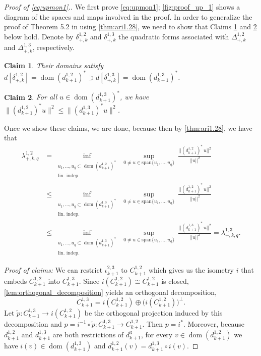 \documentclass[11pt]{article}
\newtheorem{claim}{Claim}[theorem]
\theoremstyle{definition}
\theoremstyle{remark}
\DeclareMathOperator\dom{dom}
\begin{document}
\begin{proof}[Proof of \eqref{eq:upmon1}.] We first prove \cref{eq:upmon1}; 
    \cref{fig:proof_up_1} shows a diagram of the spaces and maps involved in the proof.
    In order to generalize the proof of Theorem 5.2 in \citet{mww} using \cref{thm:ari1.28}, we need to show that Claims \ref{claim:doms} and \ref{claim:norms} below hold. Denote by $\delta_{+,k}^{1,2}$ and $\delta_{+,k}^{1,3}$ the quadratic forms associated with $\Delta_{+,k}^{1,2}$ and $\Delta_{+,k}^{1,3}$, respectively.
    \begin{claim}
        Their domains satisfy $d[\delta^{1,2}_{+,k}]=\dom (d^{1,2}_{k+1})^*\supset d[\delta^{1,3}_{+,k}]=\dom (d^{1,3}_{k+1})^*$. \label{claim:doms}
    \end{claim}
    \begin{claim}
        For all $u \in \dom(d_{k+1}^{1,3})^*$, we have $\|(d^{1,2}_{k+1})^*u\|^2 \le \|(d^{1,3}_{k+1})^*u\|^2$. \label{claim:norms}
    \end{claim}
    Once we show these claims, we are done, because then by \cref{thm:ari1.28}, we have that
    \begin{align*}
        \lambda^{1,2}_{+,k,q}&= \inf_{\substack{u_1,\dots,u_q \subset \dom(d_{k+1}^{1,2})^* \\ \text{lin.~indep.}}} \ \sup_{0 \not= u \in \text{span}\{u_1,\dots,u_q\} } \ \frac{||(d_{k+1}^{1,2})^* \, u||^2}{||u||^2} \\ &\le \inf_{\substack{u_1,\dots,u_q \subset \dom(d_{k+1}^{1,3})^* \\ \text{lin.~indep.}}} \ \sup_{0 \not= u \in \text{span}\{u_1,\dots,u_q\} } \ \frac{||(d_{k+1}^{1,2})^* \, u||^2}{||u||^2}\\
        &\le \inf_{\substack{u_1,\dots,u_q \subset \dom(d_{k+1}^{1,3})^* \\ \text{lin.~indep.}}} \ \sup_{0 \not= u \in \text{span}\{u_1,\dots,u_q\} } \ \frac{||(d_{k+1}^{1,3})^* \, u||^2}{||u||^2} = \lambda^{1,3}_{+,k,q}.
    \end{align*}

    \textit{Proof of claims:}  We can restrict $\iota_{k+1}^{2,3}$ to $C_{k+1}^{1,2}$ which gives us the isometry $i$ that embeds $C_{k+1}^{1,2}$ into $C_{k+1}^{1,3}$. Since $i(C^{1,2}_{k+1}) \cong C_{k+1}^{1,2}$ is closed, \cref{lem:orthogonal_decomposition} yields an orthogonal decomposition,
    $$
    C^{1,3}_{k+1} = i(C^{1,2}_{k+1}) \oplus \big(i(C_{k+1}^{1,2})\big)^\perp.
    $$
    Let $\tilde p: C^{1,3}_{k+1} \to i(C^{1,2}_{k+1})$ be the orthogonal projection induced by this decomposition and $p=i^{-1}\circ \tilde p:C^{1,3}_{k+1} \to C^{1,2}_{k+1}$. Then $p=i^*$. Moreover, because $d^{1,2}_{k+1}$ and $d^{1,3}_{k+1}$ are both restrictions of $d^3_{k+1}$, for every $v \in \dom(d_{k+1}^{1,2})$ we have $i(v) \in \dom(d_{k+1}^{1,3})$ and $d^{1,2}_{k+1} (v)= d^{1,3}_{k+1} \circ i(v)$.


\end{proof}
\end{document}

